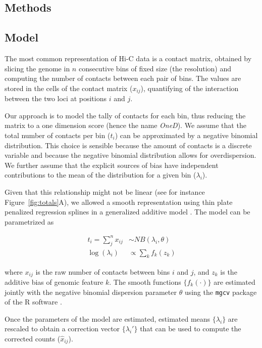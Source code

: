 \documentclass{bioinfo}
\begin{document}
\begin{methods}

\section{Methods}

\subsection{Model}
\label{sec:model}

The most common representation of Hi-C data is a contact matrix, obtained
by slicing the genome in $n$ consecutive bins of fixed size (the
resolution) and computing the number of contacts between each pair of
bins. The values are stored in the cells of the contact matrix ($x_{ij}$),
quantifying of the interaction between the two loci at positions $i$ and
$j$.

Our approach is to model the tally of contacts for each bin, thus reducing
the matrix to a one dimension score (hence the name \textit{OneD}). We
assume that the total number of contacts per bin ($t_{i}$) can be
approximated by a negative binomial distribution. This choice is sensible
because the amount of contacts is a discrete variable and because the
negative binomial distribution allows for overdispersion. We further
assume that the explicit sources of bias have independent contributions to
the mean of the distribution for a given bin ($\lambda_i$).

Given that this relationship might not be linear (see for instance
Figure~\ref{fig:totals}A), we allowed a smooth representation
using thin plate penalized regression splines \citep{wood2003thin} in a
generalized additive model \citep{wood2011fast}. The model can be
parametrized as

\begin{align*}
t_i = \sum_j^n{x_{ij}} &\sim  NB(\lambda_i, \theta) \\
\log(\lambda_i) &\propto \sum_{k}{f_k(z_k)}
\end{align*}

\noindent
where $x_{ij}$ is the raw number of contacts between bins $i$ and $j$, and
$z_k$ is the additive bias of genomic feature $k$. The smooth functions
$\{f_k(\cdot)\}$ are estimated jointly with the negative binomial
dispersion parameter $\theta$ using the \texttt{mgcv} package
\citep{wood2011fast} of the R software \citep{coreteam2014r}.

Once the parameters of the model are estimated, estimated means
$\{\lambda_i\}$ are rescaled to obtain a correction vector
$\{\lambda_i'\}$ that can be used to compute the corrected counts
($\hat{x}_{ij}$).


\end{methods}
\end{document}
